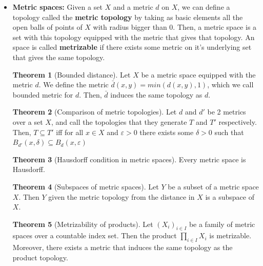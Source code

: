 \documentclass[a4paper]{book}
\theoremstyle{definition}
\newtheorem{theorem}{Theorem}[section]
\theoremstyle{ejemplo}
\theoremstyle{demostracion}
\begin{document}
\begin{itemize}
\item
\textbf{Metric spaces: }Given a set $X$ and a metric $d$ on $X$, we can define a topology called the \textbf{metric topology} by taking as basic elements all the open balls of points of $X$ with radius bigger than 0. Then, a metric space is a set with this topology equipped with the metric that gives that topology. An space is called \textbf{metrizable} if there exists some metric on it's underlying set that gives the same topology.

\begin{theorem}[Bounded distance]
Let $X$ be a metric space equipped with the metric $d$. We define the metric $\bar{d}(x,y) = min (d(x,y), 1)$, which we call bounded metric for $d$. Then, $\bar{d}$ induces the same topology as $d$.
\end{theorem}

\begin{theorem}[Comparison of metric topologies]
Let $d$ and $d'$ be 2 metrics over a set $X$, and call the topologies that they generate $T$ and $T'$ respectively. Then, $T\subseteq T'$ iff for all $x\in X$ and $\varepsilon > 0$ there exists some $\delta > 0$ such that $B_{d'}(x,\delta)\subseteq B_{d}(x, \varepsilon)$
\end{theorem}

\begin{theorem}[Hausdorff condition in metric spaces]
Every metric space is Hausdorff.
\end{theorem}

\begin{theorem}[Subspaces of metric spaces]
Let $Y$ be a subset of a metric space $X$. Then $Y$ given the metric topology from the distance in $X$ is a subspace of $X$.
\end{theorem}

\begin{theorem}[Metrizability of products]
Let $(X_{i})_{i\in I}$ be a family of metric spaces over a countable index set. Then the product ${\displaystyle \prod_{i\in I}X_{i} }$ is metrizable. Moreover, there exists a metric that induces the same topology as the product topology.
\end{theorem}


\end{itemize}
\end{document}
